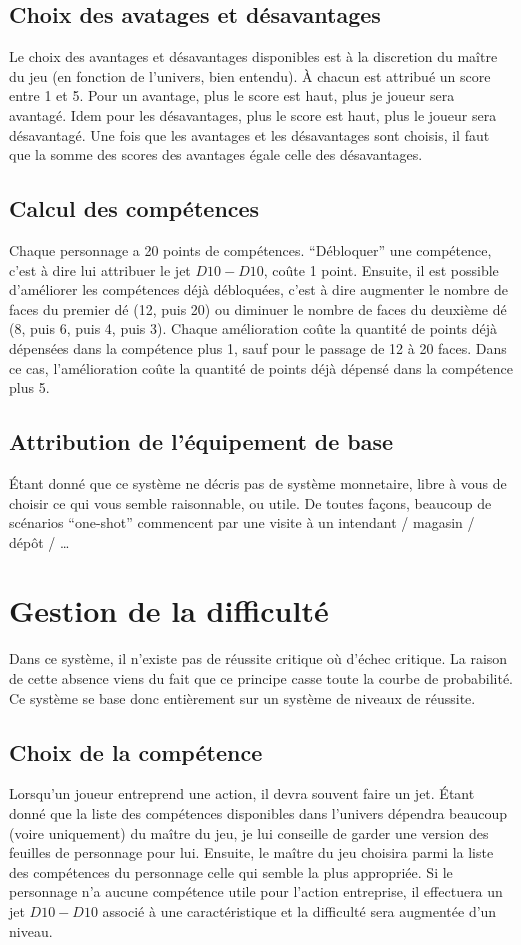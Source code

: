 \documentclass[oneside,12pt]{article}
\begin{document}
\subsection{Choix des avatages et d\'esavantages}
Le choix des avantages et d\'esavantages disponibles est \`a la discretion du ma\^itre du jeu (en fonction de l'univers, bien entendu).
\`A chacun est attribu\'e un score entre 1 et 5.
Pour un avantage, plus le score est haut, plus je joueur sera avantag\'e.
Idem pour les d\'esavantages, plus le score est haut, plus le joueur sera d\'esavantag\'e.
Une fois que les avantages et les d\'esavantages sont choisis, il faut que la somme des scores des avantages \'egale celle des d\'esavantages.
\subsection{Calcul des comp\'etences}
Chaque personnage a 20 points de comp\'etences.
``D\'ebloquer'' une comp\'etence, c'est \`a dire lui attribuer le jet $ D10 - D10 $, co\^ute 1 point.
Ensuite, il est possible d'am\'eliorer les comp\'etences d\'ej\`a d\'ebloqu\'ees, c'est \`a dire augmenter le nombre de faces du premier d\'e (12, puis 20) ou diminuer le nombre de faces du deuxi\`eme d\'e (8, puis 6, puis 4, puis 3).
Chaque am\'elioration co\^ute la quantit\'e de points d\'ej\`a d\'epens\'ees dans la comp\'etence plus 1, sauf pour le passage de 12 \`a 20 faces.
Dans ce cas, l'am\'elioration co\^ute la quantit\'e de points d\'ej\`a d\'epens\'e dans la comp\'etence plus 5.
\subsection{Attribution de l'\'equipement de base}
\'Etant donn\'e que ce syst\`eme ne d\'ecris pas de syst\`eme monnetaire, libre \`a vous de choisir ce qui vous semble raisonnable, ou utile.
De toutes fa\c cons, beaucoup de sc\'enarios ``one-shot'' commencent par une visite \`a un intendant / magasin / d\'ep\^ot / \ldots
\newpage
\section{Gestion de la difficult\'e}
Dans ce syst\`eme, il n'existe pas de r\'eussite critique o\`u d'\'echec critique.
La raison de cette absence viens du fait que ce principe casse toute la courbe de probabilit\'e.
Ce syst\`eme se base donc enti\`erement sur un syst\`eme de niveaux de r\'eussite.
\subsection{Choix de la comp\'etence}
\label{choix de la competence}
Lorsqu'un joueur entreprend une action, il devra souvent faire un jet.
\'Etant donn\'e que la liste des comp\'etences disponibles dans l'univers d\'ependra beaucoup (voire uniquement) du ma\^itre du jeu, je lui conseille de garder une version des feuilles de personnage pour lui.
Ensuite, le ma\^itre du jeu choisira parmi la liste des comp\'etences du personnage celle qui semble la plus appropri\'ee.
Si le personnage n'a aucune comp\'etence utile pour l'action entreprise, il effectuera un jet $ D10 - D10 $ associ\'e \`a une caract\'eristique et la difficult\'e sera augment\'ee d'un niveau.
\end{document}

